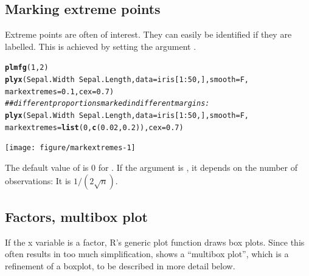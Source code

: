 \documentclass[11pt]{article}\usepackage[]{graphicx}\usepackage[]{color}
\makeatletter
\newcommand{\hlnum}[1]{\textcolor[rgb]{0.686,0.059,0.569}{#1}}%
\newcommand{\hlcom}[1]{\textcolor[rgb]{0.678,0.584,0.686}{\textit{#1}}}%
\newcommand{\hlopt}[1]{\textcolor[rgb]{0,0,0}{#1}}%
\newcommand{\hlstd}[1]{\textcolor[rgb]{0.345,0.345,0.345}{#1}}%
\newcommand{\hlkwc}[1]{\textcolor[rgb]{0.333,0.667,0.333}{#1}}%
\newcommand{\hlkwd}[1]{\textcolor[rgb]{0.737,0.353,0.396}{\textbf{#1}}}%
\newenvironment{kframe}{%
 \def\at@end@of@kframe{}%
 \ifinner\ifhmode%
  \def\at@end@of@kframe{\end{minipage}}%
  \begin{minipage}{\columnwidth}%
 \fi\fi%
 \def\FrameCommand##1{\hskip\@totalleftmargin \hskip-\fboxsep
 \colorbox{shadecolor}{##1}\hskip-\fboxsep
     \hskip-\linewidth \hskip-\@totalleftmargin \hskip\columnwidth}%
 \MakeFramed {\advance\hsize-\width
   \@totalleftmargin\z@ \linewidth\hsize
   \@setminipage}}%
 {\par\unskip\endMakeFramed%
 \at@end@of@kframe}
\newenvironment{knitrout}{}{} %
\makeatother
\begin{document}

\subsection{Marking extreme points}

Extreme points are often of interest. They can easily be identified if they 
are labelled. This is achieved by setting the argument .

\begin{knitrout}
\color{fgcolor}\begin{kframe}
\begin{alltt}
\hlkwd{plmfg}\hlstd{(}\hlnum{1}\hlstd{,}\hlnum{2}\hlstd{)}
\hlkwd{plyx}\hlstd{(Sepal.Width}\hlopt{~}\hlstd{Sepal.Length,} \hlkwc{data}\hlstd{=iris[}\hlnum{1}\hlopt{:}\hlnum{50}\hlstd{,],} \hlkwc{smooth}\hlstd{=F,}
     \hlkwc{markextremes}\hlstd{=}\hlnum{0.1}\hlstd{,} \hlkwc{cex}\hlstd{=}\hlnum{0.7}\hlstd{)}
\hlcom{## different proportions marked in different margins:}
\hlkwd{plyx}\hlstd{(Sepal.Width}\hlopt{~}\hlstd{Sepal.Length,} \hlkwc{data}\hlstd{=iris[}\hlnum{1}\hlopt{:}\hlnum{50}\hlstd{,],} \hlkwc{smooth}\hlstd{=F,}
     \hlkwc{markextremes}\hlstd{=}\hlkwd{list}\hlstd{(}\hlnum{0}\hlstd{,}\hlkwd{c}\hlstd{(}\hlnum{0.02}\hlstd{,}\hlnum{0.2}\hlstd{)),} \hlkwc{cex}\hlstd{=}\hlnum{0.7}\hlstd{)}
\end{alltt}
\end{kframe}
\texttt{[image: figure/markextremes-1]} 

\end{knitrout}
The default value of  is 0 for .
If the argument is , it depends on the number of 
observations: It is $1/(2\sqrt{n})$. 

\subsection{Factors, multibox plot}
If the x variable is a factor, R's generic plot function draws box plots.
Since this often results in too much simplification,  shows a 
``multibox plot'', which is a refinement of a boxplot, to be described in
more detail below.
\end{document}
